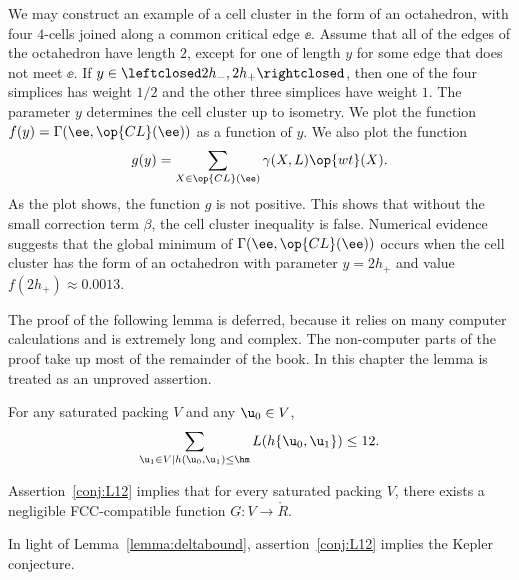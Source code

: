 \begin{example}
  We may construct an example of a cell cluster in the form of an
  octahedron, with four $4$-cells joined along a common critical edge
  $\ee$.  Assume that all of the edges of the octahedron have length
  $2$, except for one of length $y$ for some edge that does not meet
  $\ee$.  If $y\in \leftclosed 2 h_-,2 h_+\rightclosed$, then one of
  the four simplices has weight $1/2$ and the other three simplices
  have weight $1$.  The parameter $y$ determines the cell cluster up
  to isometry.  We plot the function $f(y)=\Gamma(\ee,\op{CL}(\ee))$
  as a function of $y$.    We also plot the function
\[
g(y) = \sum_{X\in \op{CL}(\ee)} \gamma(X,L) \op{wt}(X).
\]
As the plot shows, the function $g$ is not positive.  This shows
that without the small correction term $\beta$, the cell cluster
inequality is false.  Numerical evidence suggests that the global
minimum of $\Gamma(\ee,\op{CL}(\ee))$ occurs when the cell cluster has
the form of an octahedron with parameter $y=2h_+$ and value
$f(2h_+)\approx 0.0013$.
\end{example}

\jxehxqy

The proof of the following lemma is deferred, because it relies on
many computer calculations and is extremely long and complex.  The
non-computer parts of the proof take up most of the remainder of the
book.  In this chapter the lemma is treated as an unproved assertion.



\begin{lemma*}\label{conj:L12} 
  For any  saturated packing $ V$ and any $ \u_0\in V$,
\begin{equation}\label{eqn:L12} 
\sum_{ \u_1\in V\mid h( \u_0, \u_1)\le \hm} L(h\{\u_0, \u_1\}) \le 12.
\end{equation}
\end{lemma*}

\begin{lemma}[]\label{theorem:mk2} 
Assertion~\ref{conj:L12} implies
that for every saturated packing $V$, there exists a negligible FCC-compatible function
$G:V\to \ring{R}$.
\end{lemma}

\begin{remark}\label{rem:L12KC}
In light of Lemma~\ref{lemma:deltabound}, assertion~\ref{conj:L12}
implies the Kepler conjecture. 
\end{remark}

